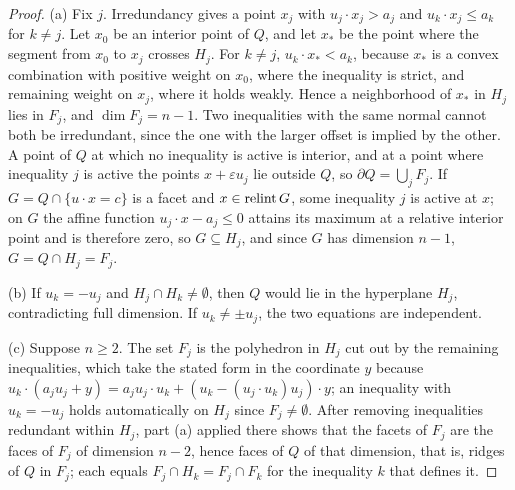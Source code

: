 \documentclass[11pt,letterpaper]{article}
\theoremstyle{plain}
\begin{document}
\begin{proof}
(a) Fix \(j\). Irredundancy gives a point \(x_j\) with \(u_j\cdot x_j>a_j\)
and \(u_k\cdot x_j\le a_k\) for \(k\ne j\). Let \(x_0\) be an interior point of
\(Q\), and let \(x_*\) be the point where the segment from \(x_0\) to \(x_j\)
crosses \(H_j\). For \(k\ne j\), \(u_k\cdot x_*<a_k\), because \(x_*\) is a
convex combination with positive weight on \(x_0\), where the inequality
is strict, and remaining weight on \(x_j\), where it holds weakly. Hence a neighborhood of
\(x_*\) in \(H_j\) lies in \(F_j\), and \(\dim F_j=n-1\). Two inequalities
with the same normal cannot both be irredundant, since the one with the
larger offset is implied by the other. A point of \(Q\) at
which no inequality is active is interior, and at a point where
inequality \(j\) is active the points \(x+\varepsilon u_j\) lie outside \(Q\),
so \(\partial Q=\bigcup_jF_j\). If \(G=Q\cap\{u\cdot x=c\}\) is a facet and
\(x\in\operatorname{relint} G\), some inequality \(j\) is active at \(x\); on \(G\) the
affine function \(u_j\cdot x-a_j\le0\) attains its maximum at a relative
interior point and is therefore zero, so \(G\subseteq H_j\), and since \(G\) has
dimension \(n-1\), \(G=Q\cap H_j=F_j\).

(b) If \(u_k=-u_j\) and \(H_j\cap H_k\ne\emptyset\), then \(Q\) would lie in
the hyperplane \(H_j\), contradicting full dimension. If \(u_k\ne\pm u_j\),
the two equations are independent.

(c) Suppose \(n\ge2\). The set \(F_j\) is the polyhedron in \(H_j\) cut out by the remaining
inequalities, which take the stated form in the coordinate \(y\) because
\(u_k\cdot(a_ju_j+y)=a_ju_j\cdot u_k+(u_k-(u_j\cdot u_k)u_j)\cdot y\); an
inequality with \(u_k=-u_j\) holds automatically on \(H_j\) since
\(F_j\ne\emptyset\). After removing inequalities redundant within \(H_j\), part (a)
applied there shows that the facets of \(F_j\) are
the faces of \(F_j\) of dimension \(n-2\), hence faces of \(Q\) of that
dimension, that is, ridges of \(Q\) in \(F_j\); each equals
\(F_j\cap H_k=F_j\cap F_k\) for the inequality \(k\) that defines it.


\end{proof}
\end{document}
